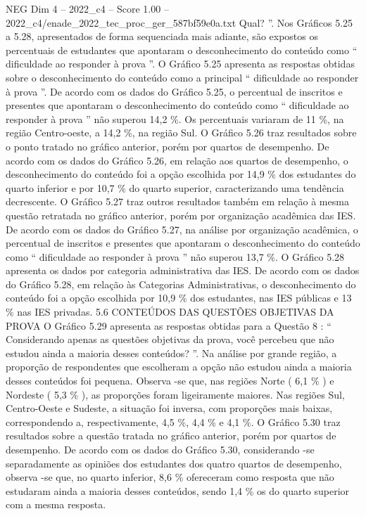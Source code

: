 \begin{textsample}{NEG Dim 4 – 2022\_c4 – Score 1.00 – 2022\_c4/enade\_2022\_tec\_proc\_ger\_587bf59e0a.txt}
Qual? ”.
Nos Gráficos 5.25 a 5.28, apresentados de forma sequenciada mais adiante, são expostos os percentuais de estudantes que apontaram o desconhecimento do conteúdo como “ dificuldade ao responder à prova ”.
O Gráfico 5.25 apresenta as respostas obtidas sobre o desconhecimento do conteúdo como a principal “ dificuldade ao responder à prova ”.
De acordo com os dados do Gráfico 5.25, o percentual de inscritos e presentes que apontaram o desconhecimento do conteúdo como “ dificuldade ao responder à prova ” não superou 14,2 \%.
Os percentuais variaram de 11 \%, na região Centro-oeste, a 14,2 \%, na região Sul.
O Gráfico 5.26 traz resultados sobre o ponto tratado no gráfico anterior, porém por quartos de desempenho.
De acordo com os dados do Gráfico 5.26, em relação aos quartos de desempenho, o desconhecimento do conteúdo foi a opção escolhida por 14,9 \% dos estudantes do quarto inferior e por 10,7 \% do quarto superior, caracterizando uma tendência decrescente.
O Gráfico 5.27 traz outros resultados também em relação à mesma questão retratada no gráfico anterior, porém por organização acadêmica das IES.
De acordo com os dados do Gráfico 5.27, na análise por organização acadêmica, o percentual de inscritos e presentes que apontaram o desconhecimento do conteúdo como “ dificuldade ao responder à prova ” não superou 13,7 \%.
O Gráfico 5.28 apresenta os dados por categoria administrativa das IES.
De acordo com os dados do Gráfico 5.28, em relação às Categorias Administrativas, o desconhecimento do conteúdo foi a opção escolhida por 10,9 \% dos estudantes, nas IES públicas e 13 \% nas IES privadas. 5.6 CONTEÚDOS DAS QUESTÕES OBJETIVAS DA PROVA O Gráfico 5.29 apresenta as respostas obtidas para a Questão 8 : “ Considerando apenas as questões objetivas da prova, você percebeu que não estudou ainda a maioria desses conteúdos? ”.
Na análise por grande região, a proporção de respondentes que escolheram a opção não estudou ainda a maioria desses conteúdos foi pequena.
Observa -se que, nas regiões Norte ( 6,1 \% ) e Nordeste ( 5,3 \% ), as proporções foram ligeiramente maiores.
Nas regiões Sul, Centro-Oeste e Sudeste, a situação foi inversa, com proporções mais baixas, correspondendo a, respectivamente, 4,5 \%, 4,4 \% e 4,1 \%.
O Gráfico 5.30 traz resultados sobre a questão tratada no gráfico anterior, porém por quartos de desempenho.
De acordo com os dados do Gráfico 5.30, considerando -se separadamente as opiniões dos estudantes dos quatro quartos de desempenho, observa -se que, no quarto inferior, 8,6 \% ofereceram como resposta que não estudaram ainda a maioria desses conteúdos, sendo 1,4 \% os do quarto superior com a mesma resposta.

\end{textsample}
